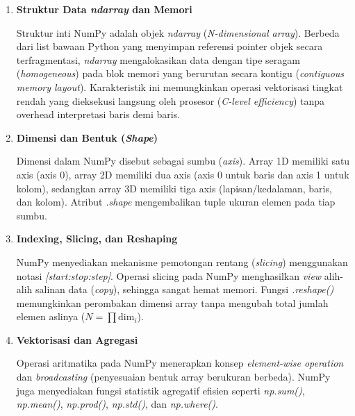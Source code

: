 \documentclass[12pt,a4paper]{article}
\begin{document}
\begin{enumerate}[label=\alph*., leftmargin=2.25cm, labelwidth=0.75cm, labelsep=0cm, align=left]
    \item \textbf{Struktur Data \textit{ndarray} dan Memori}
    
    \hspace*{0.85cm}Struktur inti NumPy adalah objek \textit{ndarray} (\textit{N-dimensional array}). Berbeda dari list bawaan Python yang menyimpan referensi pointer objek secara terfragmentasi, \textit{ndarray} mengalokasikan data dengan tipe seragam (\textit{homogeneous}) pada blok memori yang berurutan secara kontigu (\textit{contiguous memory layout}). Karakteristik ini memungkinkan operasi vektorisasi tingkat rendah yang dieksekusi langsung oleh prosesor (\textit{C-level efficiency}) tanpa overhead interpretasi baris demi baris.

    \item \textbf{Dimensi dan Bentuk (\textit{Shape})}
    
    \hspace*{0.85cm}Dimensi dalam NumPy disebut sebagai sumbu (\textit{axis}). Array 1D memiliki satu axis (axis 0), array 2D memiliki dua axis (axis 0 untuk baris dan axis 1 untuk kolom), sedangkan array 3D memiliki tiga axis (lapisan/kedalaman, baris, dan kolom). Atribut \textit{.shape} mengembalikan tuple ukuran elemen pada tiap sumbu.

    \item \textbf{Indexing, Slicing, dan Reshaping}
    
    \hspace*{0.85cm}NumPy menyediakan mekanisme pemotongan rentang (\textit{slicing}) menggunakan notasi \textit{[start:stop:step]}. Operasi slicing pada NumPy menghasilkan \textit{view} alih-alih salinan data (\textit{copy}), sehingga sangat hemat memori. Fungsi \textit{.reshape()} memungkinkan perombakan dimensi array tanpa mengubah total jumlah elemen aslinya ($N = \prod \text{dim}_i$).

    \item \textbf{Vektorisasi dan Agregasi}
    
    \hspace*{0.85cm}Operasi aritmatika pada NumPy menerapkan konsep \textit{element-wise operation} dan \textit{broadcasting} (penyesuaian bentuk array berukuran berbeda). NumPy juga menyediakan fungsi statistik agregatif efisien seperti \textit{np.sum()}, \textit{np.mean()}, \textit{np.prod()}, \textit{np.std()}, dan \textit{np.where()}.
\end{enumerate}
\end{document}
